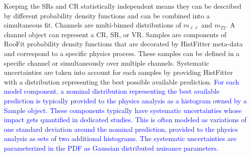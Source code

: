 Keeping the SRs and CR statistically independent means they can be described by different probability density functions and can be combined into a simultaneous fit. Channels are multi-binned distributions of $m_{\ell\ell}$ and $m_{T2}$.  A channel object can represent a CR, SR, or VR.  Samples are components of RooFit probability density functions that are decorated by HistFitter meta-data and correspond to a specific physics process.  These samples can be defined in a specific channel or simultaneously over multiple channels.  Systematic uncertainties are taken into account for each samples by providing HistFitter with a distribution representing the best possible available prediction.  \textcolor{blue}{For  each  model  component,  a  nominal  distribution  representing  the  best  available  prediction  is
typically provided to the physics analysis as a histogram owned by a Sample object.  These components typically have systematic uncertainties whose impact gets quantified in dedicated studies. This is often modeled as variations of one standard deviation around the nominal prediction, provided to the physics analysis as sets of two additional histograms.  The systematic uncertainties are parameterized in the PDF as Gaussian distributed nuisance parameters.}
